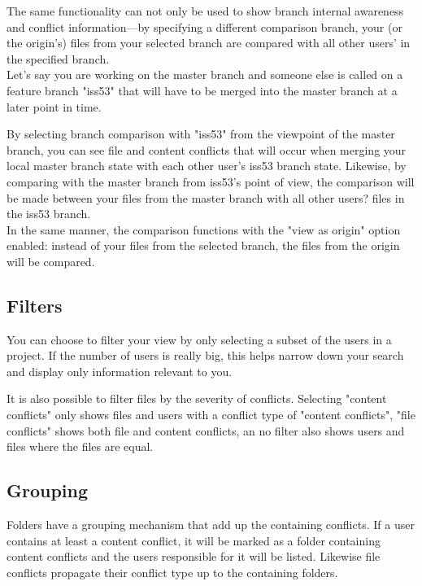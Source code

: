 The same functionality can not only be used to show branch internal awareness and conflict information---by specifying a different comparison branch, your (or the origin's) files from your selected branch are compared with all other users' in the specified branch. \\

Let's say you are working on the master branch and someone else is called on a feature branch "iss53" that will have to be merged into the master branch at a later point in time.

By selecting branch comparison with "iss53" from the viewpoint of the master branch, you can see file and content conflicts that will occur when merging your local master branch state with each other user's iss53 branch state. Likewise, by comparing with the master branch from iss53's point of view, the comparison will be made between your files from the master branch with all other users? files in the iss53 branch. \\

In the same manner, the comparison functions with the "view as origin" option enabled: instead of your files from the selected branch, the files from the origin will be compared.

\subsection{Filters}

You can choose to filter your view by only selecting a subset of the users in a project. If the number of users is really big, this helps narrow down your search and display only information relevant to you.

It is also possible to filter files by the severity of conflicts. Selecting "content conflicts" only shows files and users with a conflict type of "content conflicts", "file conflicts" shows both file and content conflicts, an no filter also shows users and files where the files are equal.

\subsection{Grouping}

Folders have a grouping mechanism that add up the containing conflicts. If a user contains at least a content conflict, it will be marked as a folder containing content conflicts and the users responsible for it will be listed. Likewise file conflicts propagate their conflict type up to the containing folders.

